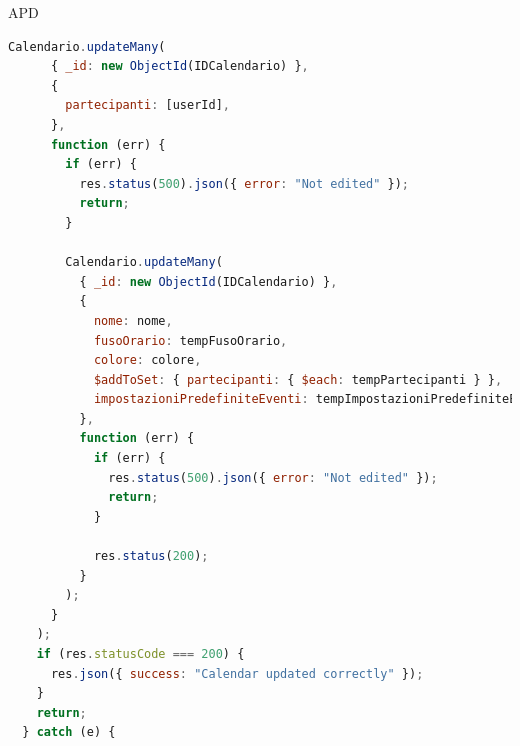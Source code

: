 \begin{listaPersonale} {APD}
\begin{listaPersonale2}[APD]{}
\begin{lstlisting}[language=JavaScript]
    Calendario.updateMany(
      { _id: new ObjectId(IDCalendario) },
      {
        partecipanti: [userId],
      },
      function (err) {
        if (err) {
          res.status(500).json({ error: "Not edited" });
          return;
        }

        Calendario.updateMany(
          { _id: new ObjectId(IDCalendario) },
          {
            nome: nome,
            fusoOrario: tempFusoOrario,
            colore: colore,
            $addToSet: { partecipanti: { $each: tempPartecipanti } },
            impostazioniPredefiniteEventi: tempImpostazioniPredefiniteEventi,
          },
          function (err) {
            if (err) {
              res.status(500).json({ error: "Not edited" });
              return;
            }

            res.status(200);
          }
        );
      }
    );
    if (res.statusCode === 200) {
      res.json({ success: "Calendar updated correctly" });
    }
    return;
  } catch (e) {
    

\end{lstlisting}
\end{listaPersonale2}
\end{listaPersonale}
